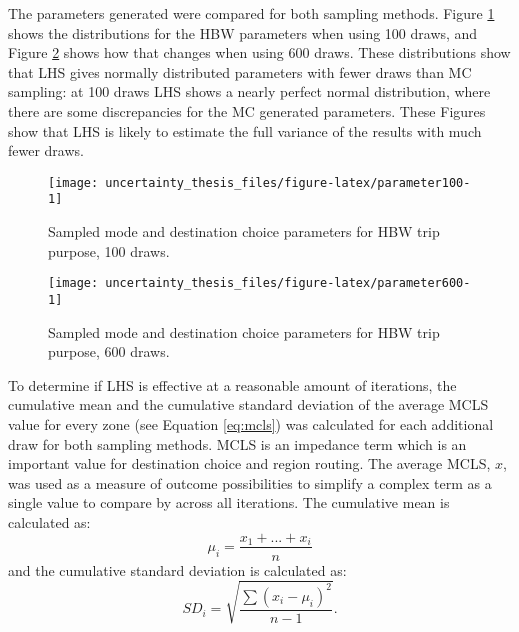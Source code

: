 \documentclass[fancy, masters, twoside]{byuthesis}
\begin{document}
The parameters generated were compared for both sampling methods. Figure \ref{fig:parameter100} shows the distributions for the HBW parameters when using 100 draws, and Figure \ref{fig:parameter600} shows how that changes when using 600 draws. These distributions show that LHS gives normally distributed parameters with fewer draws than MC sampling: at 100 draws LHS shows a nearly perfect normal distribution, where there are some discrepancies for the MC generated parameters. These Figures show that LHS is likely to estimate the full variance of the results with much fewer draws.

\begin{figure}

{\centering \texttt{[image: uncertainty\_thesis\_files/figure-latex/parameter100-1]} 

}

\caption{Sampled mode and destination choice parameters for HBW trip purpose, 100 draws.}\label{fig:parameter100}
\end{figure}

\begin{figure}

{\centering \texttt{[image: uncertainty\_thesis\_files/figure-latex/parameter600-1]} 

}

\caption{Sampled mode and destination choice parameters for HBW trip purpose, 600 draws.}\label{fig:parameter600}
\end{figure}

To determine if LHS is effective at a reasonable amount of iterations, the cumulative mean and the cumulative standard deviation of the average MCLS value for every zone (see Equation \eqref{eq:mcls}) was calculated for each additional draw for both sampling methods. MCLS is an impedance term which is an important value for destination choice and region routing. The average MCLS, \(x\), was used as a measure of outcome possibilities to simplify a complex term as a single value to compare by across all iterations. The cumulative mean is calculated as:
\begin{equation}
\mu_i = \frac{x_1 + ... + x_i}{n}
\label{eq:cmclsmean}
\end{equation}
and the cumulative standard deviation is calculated as:
\begin{equation}
SD_i = \sqrt{\frac{\sum (x_i - \mu_i)^2 }{n-1}}.
\label{eq:sdi}
\end{equation}
\end{document}
